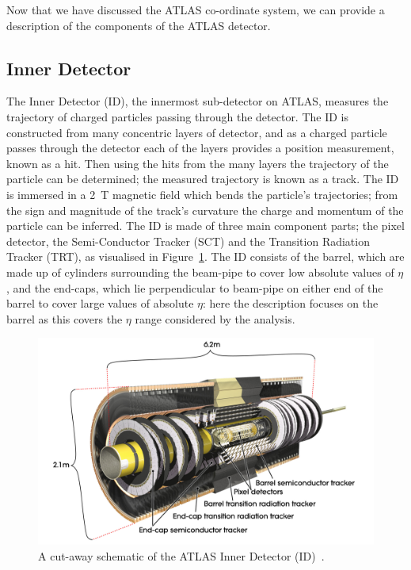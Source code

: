 Now that we have discussed the ATLAS co-ordinate system, we can provide a description of the components of the ATLAS detector.

\subsection{Inner Detector}
\label{sec:det-ID}

The Inner Detector (ID), the innermost sub-detector on ATLAS,
measures the trajectory of charged particles passing through the detector.
The ID is constructed from many concentric layers of detector,
and as a charged particle passes through the detector each of the layers provides a position measurement, known as a hit.
Then using the hits from the many layers the trajectory of the particle can be determined;
the measured trajectory is known as a track.
The ID is immersed in a 2~T magnetic field which bends the particle's trajectories;
from the sign and magnitude of the track's curvature the charge and momentum of the particle can be inferred.
The ID is made of three main component parts; the pixel detector, the Semi-Conductor Tracker
(SCT) and the Transition Radiation Tracker (TRT), as visualised in Figure~\ref{fig:det-ID_schem}.
The ID consists of the barrel, which are made up of cylinders surrounding the beam-pipe to cover low absolute values of $\eta$,
and the end-caps, which lie  perpendicular to beam-pipe on either end of the barrel to cover large values of absolute $\eta$:
here the description focuses on the barrel as this covers the $\eta$ range considered by the analysis.

\begin{figure}[!ht]
  \begin{center}
    \includegraphics[width=0.8\linewidth, angle=0]{figs/Detector/ID_schem.pdf}
  \end{center}
  \caption[A cut-away schematic of the ATLAS Inner Detector (ID).]{A cut-away schematic of the ATLAS Inner Detector (ID)~\cite{det-ATLAS_Exp}.}
  \label{fig:det-ID_schem}
\end{figure}

